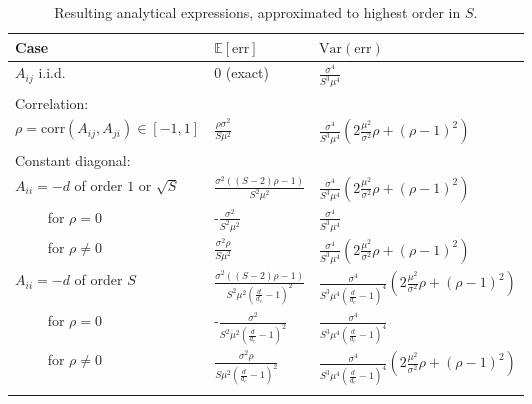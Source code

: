 \documentclass[10pt]{article}
\begin{document}
\begin{table}[h]
    \centering
    \caption[Results]{Resulting analytical expressions, approximated to highest order in $S$. 
        }
    \label{tab:model_description}
    \small
    {\tabulinesep=1.2mm
       \begin{tabu} {b{4cm} p{2.5cm} p{4.5cm}}
            \textbf{Case} & $\mathbb{E}[\mathrm{err}]$ & $\mathrm{Var}(\mathrm{err})$ \\
           \hline
    $A_{ij}$ i.i.d.                    & $0$ (exact)                     & $\frac{\sigma^4}{S^3 \mu^4}$ \\
    \vspace{1.mm}

    Correlation: &&\\
    $\rho = \mathrm{corr}(A_{ij}, A_{ji}) \in [-1, 1]$     
        & $\frac{\rho \sigma^2}{S\mu^2}$ 
        & $\frac{\sigma^4}{S^3 \mu^4} \left(2\frac{\mu^2}{\sigma^2} \rho + (\rho - 1)^2\right) $ \\ 
    \vspace{1.mm}

    Constant diagonal: &&\\
    $A_{ii} = -d$ of order $1$ or $\sqrt{S}$    
        & $\frac{\sigma^2\left((S - 2)\rho - 1\right)}{S^2\mu^2}$ 
        & $\frac{\sigma^4}{S^3 \mu^4} \left(2\frac{\mu^2}{\sigma^2} \rho + (\rho - 1)^2\right) $ \\ 
    $\qquad$ for $\rho = 0$   
        & -$\frac{\sigma^2}{S^2\mu^2}$ 
        & $\frac{\sigma^4}{S^3 \mu^4} $ \\
    $\qquad$ for $\rho \ne 0$ 
        & $\frac{\sigma^2\rho}{S\mu^2}$ 
        & $\frac{\sigma^4}{S^3 \mu^4} \left(2\frac{\mu^2}{\sigma^2} \rho + (\rho - 1)^2\right) $ \\ 

    $A_{ii} = -d$ of order $S$ 
        & $\frac{\sigma^2\left((S - 2)\rho - 1\right)}{S^2\mu^2\left(\frac{d}{d_c} - 1\right)^2}$ 
        & $\frac{\sigma^4}{S^3 \mu^4\left(\frac{d}{d_c} - 1\right)^4}\left(2\frac{\mu^2}{\sigma^2} \rho + (\rho - 1)^2\right)$ \\
    $\qquad$ for $\rho = 0$   
        & -$\frac{\sigma^2}{S^2\mu^2\left(\frac{d}{d_c} - 1\right)^2}$ 
        & $\frac{\sigma^4 }{S^3 \mu^4\left(\frac{d}{d_c} - 1\right)^4} $  \\
    $\qquad$ for $\rho \ne 0$ 
        & $\frac{\sigma^2\rho}{S\mu^2\left(\frac{d}{d_c} - 1\right)^2}$ 
        & $\frac{\sigma^4}{S^3 \mu^4\left(\frac{d}{d_c} - 1\right)^4}\left(2\frac{\mu^2}{\sigma^2} \rho + (\rho - 1)^2\right)$ \\ \hline
    \label{tab:results}
   \end{tabu}}
\end{table}
\end{document}
